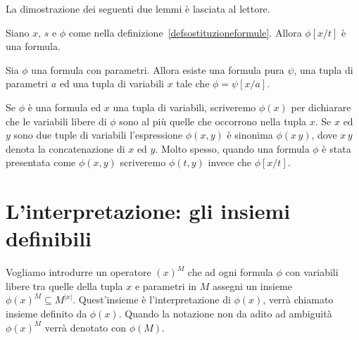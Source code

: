 La dimostrazione dei seguenti due lemmi \`e lasciata al lettore.

\begin{lemma} 
Siano $x$, $s$ e $\phi$ come nella definizione~\ref{defsostituzioneformule}. Allora $\phi[x/t]$ \`e una formula.\QED
\end{lemma}

\begin{lemma}\label{rappresentazione formule con parametri}
Sia $\phi$ una formula con parametri. Allora esiste una formula pura $\psi$, una tupla di parametri $a$ ed una tupla di variabili $x$ tale che $\phi=\psi[x/a]$.\QED
\end{lemma}

Se $\phi$ \`e una formula ed $x$ una tupla di variabili, scriveremo $\phi(x)$ per dichiarare che le variabili libere di $\phi$ sono al pi\`u quelle che occorrono nella tupla $x$. Se $x$ ed $y$ sono due tuple di variabili l'espressione $\phi(x,y)$ \`e sinonima $\phi(x\,y)$, dove $x\,y$ denota la concatenazione di $x$ ed $y$. Molto spesso, quando una formula $\phi$ \`e stata presentata come $\phi(x,y)$ scriveremo \emph{$\phi(t,y)$\/} invece che $\phi[x/t]$.


\section{L'interpretazione: gli insiemi definibili}
\label{idefinibili}

Vogliamo introdurre un operatore $(x)^M$ che ad ogni formula $\phi$ con variabili libere tra quelle della tupla $x$ e parametri in $M$ assegni un insieme $\phi(x)^M\subseteq M^{|x|}$. Quest'insieme \`e l'interpretazione di $\phi(x)$, verr\`a chiamato insieme definito da $\phi(x)$. Quando la notazione non da adito ad ambiguit\`a $\phi(x)^M$ verr\`a denotato con \emph{$\phi(M)$}.




